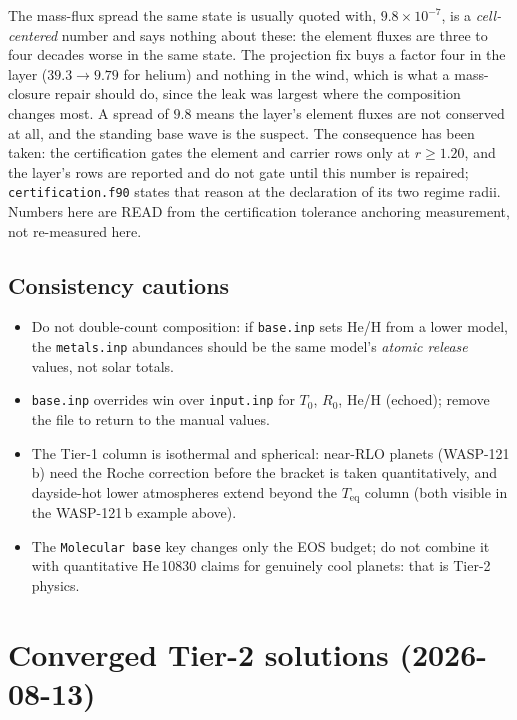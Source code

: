 \documentclass[english,a4paper]{my_memo}
\begin{document}
\noindent The mass-flux spread the same state is usually quoted with,
$9.8\times10^{-7}$, is a \emph{cell-centered} number and says nothing about
these: the element fluxes are three to four decades worse in the same state.
The projection fix buys a factor four in the layer ($39.3 \rightarrow 9.79$
for helium) and nothing in the wind, which is what a mass-closure repair
should do, since the leak was largest where the composition changes most. A
spread of $9.8$ means the layer's element fluxes are not conserved at all,
and the standing base wave is the suspect. The consequence has been taken:
the certification gates the element and carrier rows only at $r \ge 1.20$,
and the layer's rows are reported and do not gate until this number is
repaired; \texttt{certification.f90} states that reason at the declaration of
its two regime radii. Numbers here are READ from the certification
tolerance anchoring measurement, not re-measured here.

\subsection{Consistency cautions}
\begin{itemize}
\item Do not double-count composition: if \texttt{base.inp} sets He/H from a lower model,
  the \texttt{metals.inp} abundances should be the same model's \emph{atomic release}
  values, not solar totals.
\item \texttt{base.inp} overrides win over \texttt{input.inp} for $T_0$, $R_0$, He/H
  (echoed); remove the file to return to the manual values.
\item The Tier-1 column is isothermal and spherical: near-RLO planets (WASP-121\,b) need
  the Roche correction before the bracket is taken quantitatively, and dayside-hot lower
  atmospheres extend beyond the $T_\mathrm{eq}$ column (both visible in the WASP-121\,b
  example above).
\item The \texttt{Molecular base} key changes only the EOS budget; do not combine it with
  quantitative He\,10830 claims for genuinely cool planets: that is Tier-2 physics.
\end{itemize}

\section{Converged Tier-2 solutions (2026-08-13)}\label{sec:converged}
\end{document}
